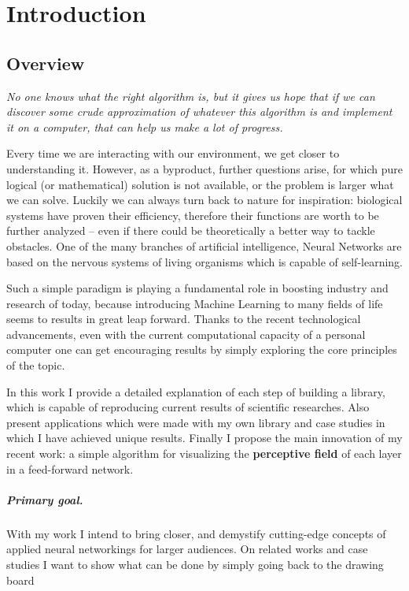 \chapter{Introduction}
\section{Overview}


\epigraph{\textit{No one knows what the right algorithm is, but it gives us hope that if we can discover some crude approximation of whatever this algorithm is and implement it on a computer, that can help us make a lot of progress.}}{}

Every time we are interacting with our environment, we get closer to understanding it. %
However, as a byproduct, further questions arise, for which pure logical (or mathematical) solution is not available, or the problem is larger what we can solve.
Luckily we can always turn back to nature for inspiration: biological systems have proven their efficiency, therefore their functions are worth to be further analyzed -- even if there could be theoretically a better way to tackle obstacles. 
One of the many branches of artificial intelligence, Neural Networks are based on the nervous systems of living organisms which is capable of self-learning.

Such a simple paradigm is playing a fundamental role in boosting 
industry and research of today, because introducing Machine Learning to many fields of life seems to results in great leap forward. 
Thanks to the recent technological advancements, even with the current computational capacity of a personal computer one can get encouraging results by simply exploring the core principles of the topic. 

In this work I provide a detailed explanation of each step of building a library,
which is capable of reproducing current results of scientific researches.
Also present applications which were made with my own library and case studies in which I have achieved unique results.
Finally I propose the main innovation of my recent work: a simple algorithm for visualizing the \textbf{perceptive field} of each layer in a feed-forward network.

\paragraph{Primary goal.} With my work I intend to bring closer, and demystify cutting-edge concepts of applied neural networkings for larger audiences. 
On related works and case studies I want to show what can be done by simply going back to the drawing board

